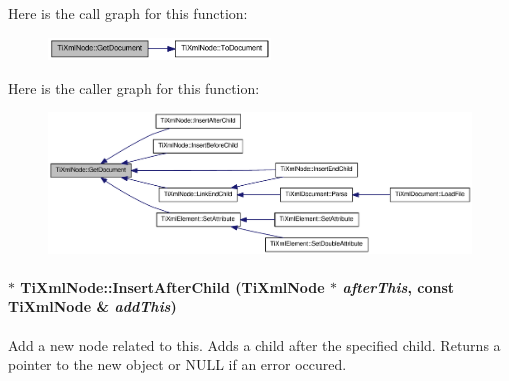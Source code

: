 Here is the call graph for this function:\nopagebreak
\begin{figure}[H]
\begin{center}
\leavevmode
\includegraphics[width=167pt]{class_ti_xml_node_aa66f4ebcd175204a168ed7c2d7b43071_cgraph}
\end{center}
\end{figure}


Here is the caller graph for this function:\nopagebreak
\begin{figure}[H]
\begin{center}
\leavevmode
\includegraphics[width=360pt]{class_ti_xml_node_aa66f4ebcd175204a168ed7c2d7b43071_icgraph}
\end{center}
\end{figure}
\hypertarget{class_ti_xml_node_a274db3292218202805c093f66a964cb5}{
\paragraph[{InsertAfterChild}]{ $\ast$ TiXmlNode::InsertAfterChild ({\bf TiXmlNode} $\ast$ {\em afterThis}, \/  const {\bf TiXmlNode} \& {\em addThis})}\hfill}
\label{class_ti_xml_node_a274db3292218202805c093f66a964cb5}
Add a new node related to this. Adds a child after the specified child. Returns a pointer to the new object or NULL if an error occured. 

